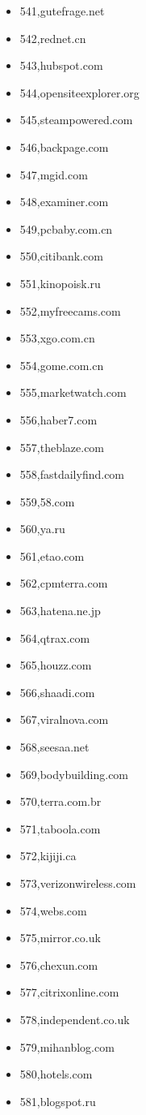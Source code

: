 \begin{multicols}{3}
\begin{itemize}
	\item 541,gutefrage.net
	\item 542,rednet.cn
	\item 543,hubspot.com
	\item 544,opensiteexplorer.org
	\item 545,steampowered.com
	\item 546,backpage.com
	\item 547,mgid.com
	\item 548,examiner.com
	\item 549,pcbaby.com.cn
	\item 550,citibank.com
	\item 551,kinopoisk.ru
	\item 552,myfreecams.com
	\item 553,xgo.com.cn
	\item 554,gome.com.cn
	\item 555,marketwatch.com
	\item 556,haber7.com
	\item 557,theblaze.com
	\item 558,fastdailyfind.com
	\item 559,58.com
	\item 560,ya.ru
	\item 561,etao.com
	\item 562,cpmterra.com
	\item 563,hatena.ne.jp
	\item 564,qtrax.com
	\item 565,houzz.com
	\item 566,shaadi.com
	\item 567,viralnova.com
	\item 568,seesaa.net
	\item 569,bodybuilding.com
	\item 570,terra.com.br
	\item 571,taboola.com
	\item 572,kijiji.ca
	\item 573,verizonwireless.com
	\item 574,webs.com
	\item 575,mirror.co.uk
	\item 576,chexun.com
	\item 577,citrixonline.com
	\item 578,independent.co.uk
	\item 579,mihanblog.com
	\item 580,hotels.com
	\item 581,blogspot.ru

\end{itemize}
\end{multicols}
